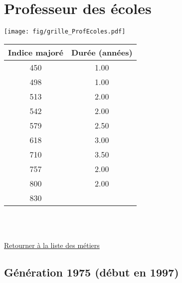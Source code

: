 \newpage 
 
\chapter{Professeur des écoles} 

\begin{minipage}{0.55\linewidth}\texttt{[image: fig/grille\_ProfEcoles.pdf]}\end{minipage} 
\begin{minipage}{0.3\linewidth} 
 \begin{center} 

\begin{tabular}[htb]{|c|c|} 
\hline 
 Indice majoré &  Durée (années) \\ 
\hline \hline 
 450 &  1.00 \\ 
\hline 
 498 &  1.00 \\ 
\hline 
 513 &  2.00 \\ 
\hline 
 542 &  2.00 \\ 
\hline 
 579 &  2.50 \\ 
\hline 
 618 &  3.00 \\ 
\hline 
 710 &  3.50 \\ 
\hline 
 757 &  2.00 \\ 
\hline 
 800 &  2.00 \\ 
\hline 
 830 &   \\ 
\hline 
\hline 
\end{tabular} 
\end{center} 
 \end{minipage} 

~\\ 
 


   
 \localtableofcontents 

~\\ 
 
 \hyperlink{page.2}{\noindent Retourner à la liste des métiers}

 \newpage 

\section{Génération 1975 (début en 1997)\label{ProfEcoles_100_22_1975_0}} 
 
